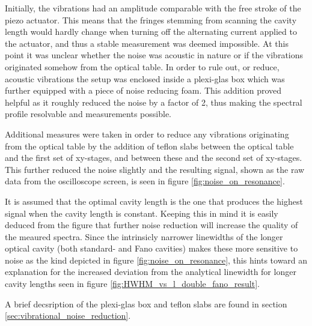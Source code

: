 Initially, the vibrations had an amplitude comparable with the free stroke of the piezo actuator. This means that the fringes stemming from scanning the cavity length would hardly change when turning off the alternating current applied to the actuator, and thus a stable measurement was deemed impossible. At this point it was unclear whether the noise was acoustic in nature or if the vibrations originated somehow from the optical table. In order to rule out, or reduce, acoustic vibrations the setup was enclosed inside a plexi-glas box which was further equipped with a piece of noise reducing foam. This addition proved helpful as it roughly reduced the noise by a factor of 2, thus making the spectral profile resolvable and measurements possible. 

Additional measures were taken in order to reduce any vibrations originating from the optical table by the addition of teflon slabs between the optical table and the first set of xy-stages, and between these and the second set of xy-stages. This further reduced the noise slightly and the resulting signal, shown as the raw data from the oscilloscope screen, is seen in figure \ref{fig:noise_on_resonance}.

It is assumed that the optimal cavity length is the one that produces the highest signal when the cavity length is constant. Keeping this in mind it is easily deduced from the figure that further noise reduction will increase the quality of the meaured spectra. Since the intrinsicly narrower linewidths of the longer optical cavity (both standard- and Fano cavities) makes these more sensitive to noise as the kind depicted in figure \ref{fig:noise_on_resonance}, this hints toward an explanation for the increased deviation from the analytical linewidth for longer cavity lengths seen in figure \ref{fig:HWHM_vs_l_double_fano_result}.

A brief decsription of the plexi-glas box and teflon slabs are found in section \ref{sec:vibrational_noise_reduction}.

